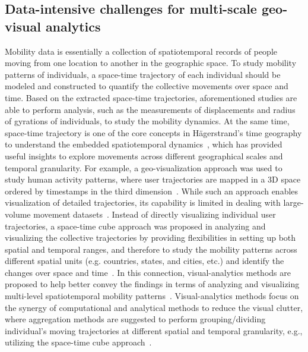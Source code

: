 \documentclass[ijgi,article,submit,moreauthors,pdftex,10pt,a4paper]{mdpi}
\theoremstyle{mdpi}
\newcounter{ex}
\newcounter{re}
\theoremstyle{mdpidefinition}
\begin{document}
\subsection{Data-intensive challenges for multi-scale geo-visual analytics}
Mobility data is essentially a collection of spatiotemporal records of people moving from one location to another in the geographic space.
To study mobility patterns of individuals, a space-time trajectory of each individual should be modeled and constructed to quantify the collective movements over space and time.
Based on the extracted space-time trajectories, aforementioned studies are able to perform analysis, such as the measurements of displacements and radius of gyrations of individuals, to study the mobility dynamics.
At the same time, space-time trajectory is one of the core concepts in H{\"a}gerstrand's time geography to understand the embedded spatiotemporal dynamics~\cite{hagerstrand1985time}, which has provided useful insights to explore movements across different geographical scales and temporal granularity.
For example, a geo-visualization approach was used to study human activity patterns, where user trajectories are mapped in a 3D space ordered by timestamps in the third dimension~\cite{kwan2004geovisualization}. While such an approach enables visualization of detailed trajectories, its capability is limited in dealing with large-volume movement datasets~\cite{andrienko2007designing}.
Instead of directly visualizing individual user trajectories, a space-time cube approach was proposed in analyzing and visualizing the collective trajectories by providing flexibilities in setting up both spatial and temporal ranges, and therefore to study the mobility patterns across different spatial units (e.g. countries, states, and cities, etc.) and identify the changes over space and time~\cite{maceachren2001research, maceachren2004maps}.
In this connection, visual-analytics methods are proposed to help better convey the findings in terms of analyzing and visualizing multi-level spatiotemporal mobility patterns~\cite{andrienko2007designing,andrienko2007visual}.
Visual-analytics methods focus on the synergy of computational and analytical methods to reduce the visual clutter, where aggregation methods are suggested to perform grouping/dividing individual's moving trajectories at different spatial and temporal granularity, e.g., utilizing the space-time cube approach~\cite{andrienko2007designing}.
\end{document}

